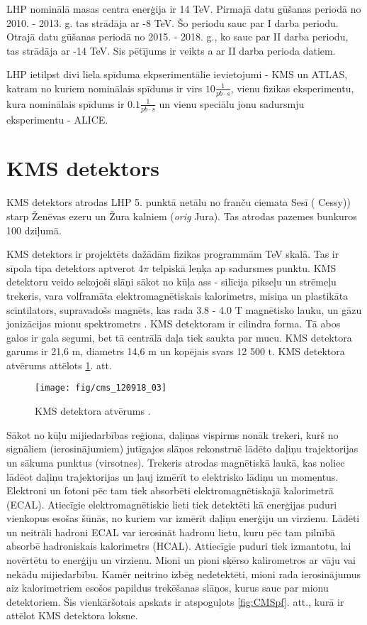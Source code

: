 LHP nominālā masas centra enerģija ir 14 TeV. Pirmajā datu gūšanas periodā no 2010. - 2013. g. tas strādāja ar -8 TeV. Šo periodu sauc par I \gls{darba periodu}. Otrajā datu gūšanas periodā no 2015. - 2018. g., ko sauc par II darba periodu, tas strādāja ar -14 TeV. Sis pētījums ir veikts a ar II darba perioda datiem.

LHP ietilpst divi liela spīduma ekpserimentālie ievietojumi - KMS un ATLAS, katram no kuriem nominālais spīdums ir virs $10{\frac{1}{pb\cdot s}}$, vienu \cPqb fizikas eksperimentu, kura nominālais spīdums ir $0.1\frac{1}{pb\cdot s}$ un vienu speciālu jonu sadursmju eksperimentu - ALICE. 

\section{KMS detektors}

KMS detektors atrodas LHP 5. punktā netālu no franču ciemata Sesī ( Cessy)) starp Ženēvas ezeru un Žura kalniem (\textit{orig} Jura). Tas atrodas pazemes bunkuros 100 dziļumā. 

KMS detektors ir projektēts dažādām fizikas programmām TeV skalā. Tas ir sīpola tipa detektors aptverot $4\pi$ telpiskā leņķa ap sadursmes punktu. KMS detektoru veido sekojoši slāņi sākot no kūļa ass - silīcija pikseļu un \gls{strēmeļu} trekeris, vara volframāta elektromagnētiskais kalorimetrs, misiņa un plastikāta scintilators, supravadošs magnēts, kas rada 3.8 - 4.0 T magnētisko lauku, un gāzu jonizācijas mionu spektrometrs \cite{Chatrchyan:2008aa}. KMS detektoram ir cilindra forma. Tā abos galos ir \gls{gala segumi}, bet tā centrālā daļa tiek saukta par \gls{mucu}. KMS detektora garums ir 21,6 m, diametrs 14,6 m un kopējais svars 12 500 t. KMS detektora atvērums attēlots \ref{fig:CMS_detector}. att.

\begin{figure}[hbtp]
\centering
\def\twidth{1}
\texttt{[image: fig/cms\_120918\_03]}
\caption{KMS detektora atvērums \cite{Sakuma:2013jqa}.}
\label{fig:CMS_detector}
\end{figure}


Sākot no kūļu mijiedarbības reģiona, daļiņas vispirms nonāk trekeri, kurš no signāliem (\gls{ierosinājumiem}) jutīgajos slāņos rekonstruē lādēto daļiņu trajektorijas un sākuma punktus (\gls{virsotnes}). Trekeris atrodas magnētiskā laukā, kas noliec lādēot daļiņu trajektorijas un ļauj izmērīt to elektrisko lādiņu un momentus. Elektroni un fotoni pēc tam tiek absorbēti elektromagnētiskajā kalorimetrā (ECAL). Atiecīgie elektromagnētiskie lieti tiek detektēti kā enerģijas \gls{puduri} vienkopus esošas šūnās, no kuriem var izmērīt daļiņu enerģiju un virzienu. Lādēti un neitrāli hadroni ECAL var ierosināt hadronu lietu, kuru pēc tam pilnībā absorbē hadroniskais kalorimetrs (HCAL). Attiecīgie puduri tiek izmantotu, lai novērtētu to enerģiju un virzienu.  Mioni un pioni sķērso kalirometros ar vāju vai nekādu mijiedarbību. Kamēr neitrino izbēg nedetektēti, mioni rada ierosinājumus aiz kalorimetriem esošos papildus trekēšanas slāņos, kurus sauc par mionu detektoriem. Šis vienkāršotais apskats ir atspoguļots \ref{fig:CMSpf}. att., kurā ir attēlot KMS detektora loksne.

